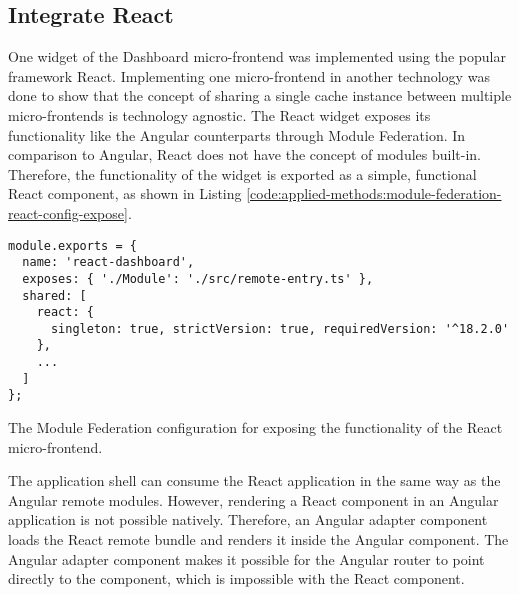\subsection{Integrate React}\label{subsection:applied-methods:prototypical-implementation:react-micro-frontend}

One widget of the Dashboard micro-frontend was implemented using the popular framework React. Implementing one micro-frontend in another technology was done to show that the concept of sharing a single cache instance between multiple micro-frontends is technology agnostic. The React widget exposes its functionality like the Angular counterparts through Module Federation. In comparison to Angular, React does not have the concept of modules built-in. Therefore, the functionality of the widget is exported as a simple, functional React component, as shown in Listing  \ref{code:applied-methods:module-federation-react-config-expose}.

\ifshowListings
\begin{listing}[H]
  \begin{verbatim}
module.exports = {
  name: 'react-dashboard',
  exposes: { './Module': './src/remote-entry.ts' },
  shared: [
    react: {
      singleton: true, strictVersion: true, requiredVersion: '^18.2.0' 
    },
    ...
  ]
};
  \end{verbatim}
  \caption{The Module Federation configuration for exposing the functionality of the React micro-frontend.}\label{code:applied-methods:module-federation-react-config-expose}
\end{listing}
\fi

\noindent The application shell can consume the React application in the same way as the Angular remote modules. However, rendering a React component in an Angular application is not possible natively. Therefore, an Angular adapter component loads the React remote bundle and renders it inside the Angular component. The Angular adapter component makes it possible for the Angular router to point directly to the component, which is impossible with the React component.

\bigskip

